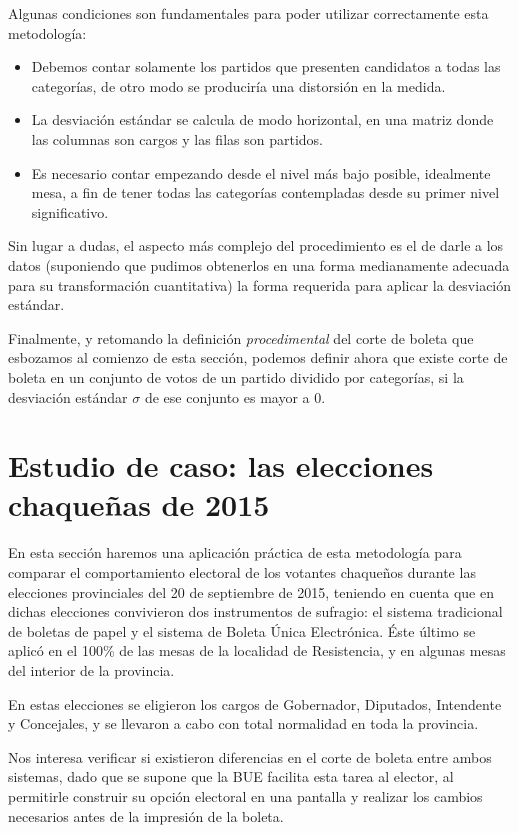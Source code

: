 \documentclass[12pt,a4paper]{article}
\begin{document}
Algunas condiciones son fundamentales para poder utilizar correctamente esta
metodología:

\begin{itemize}
  \item Debemos contar solamente los partidos que presenten candidatos a todas
    las categorías, de otro modo se produciría una distorsión en la medida.
  \item La desviación estándar se calcula de modo horizontal, en una matriz donde
    las columnas son cargos y las filas son partidos.
  \item Es necesario contar empezando desde el nivel más bajo posible,
    idealmente mesa, a fin de tener todas las categorías contempladas desde su
    primer nivel significativo.
\end{itemize}

Sin lugar a dudas, el aspecto más complejo del procedimiento es el de darle a
los datos (suponiendo que pudimos obtenerlos en una forma medianamente adecuada
para su transformación cuantitativa) la forma requerida para aplicar la
desviación estándar.

Finalmente, y retomando la definición \emph{procedimental} del corte de boleta
que esbozamos al comienzo de esta sección, podemos definir ahora que existe
corte de boleta en un conjunto de votos de un partido dividido por categorías,
si la desviación estándar $\sigma$ de ese conjunto es mayor a 0.

\pagebreak

\section{Estudio de caso: las elecciones chaqueñas de 2015}

En esta sección haremos una aplicación práctica de esta metodología para comparar
el comportamiento electoral de los votantes chaqueños durante las elecciones
provinciales del 20 de septiembre de 2015, teniendo en cuenta que en dichas
elecciones convivieron dos instrumentos de sufragio: el sistema tradicional de
boletas de papel y el sistema de Boleta Única Electrónica. Éste último se aplicó
en el 100\% de las mesas de la localidad de Resistencia, y en algunas mesas del
interior de la provincia.

En estas elecciones se eligieron los cargos de Gobernador, Diputados, Intendente
y Concejales, y se llevaron a cabo con total normalidad en toda la provincia.

Nos interesa verificar si existieron diferencias en el corte de boleta entre
ambos sistemas, dado que se supone que la BUE facilita esta tarea al elector, al
permitirle construir su opción electoral en una pantalla y realizar los cambios
necesarios antes de la impresión de la boleta.
\end{document}
